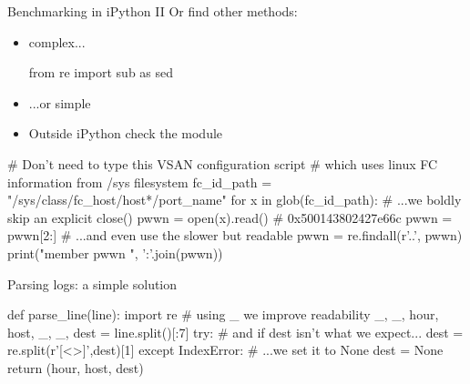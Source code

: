 \begin{pyframe}{Benchmarking in iPython II}
Or find other methods: 
\begin{itemize}
\item complex...
\begin{pycode}
from re import sub as sed
\end{pycode}
\item ...or simple
\begin{pycode}
\end{pycode}
\item Outside iPython check the  module
\end{itemize}
\end{pyframe}

%

\begin{pyframe}{}
\begin{pycode}
# Don't need to type this VSAN configuration script
#  which uses linux FC information from /sys filesystem
fc_id_path = "/sys/class/fc_host/host*/port_name"
for x in glob(fc_id_path):
    # ...we boldly skip an explicit close()
    pwwn = open(x).read()  # 0x500143802427e66c
    pwwn = pwwn[2:]
    # ...and even use the slower but readable
    pwwn = re.findall(r'..', pwwn)
    print("member pwwn ", ':'.join(pwwn))

\end{pycode}
\end{pyframe}

\begin{pyframe}{Parsing logs: a simple solution}
\begin{pycode}
def parse_line(line):
    import re
    # using _ we improve readability
    _, _, hour, host, _, _, dest = line.split()[:7]
    try:
        # and if dest isn't what we expect...
        dest = re.split(r'[<>]',dest)[1]
    except IndexError:
        # ...we set it to None
        dest = None
    return (hour, host, dest)
\end{pycode}
\end{pyframe}
